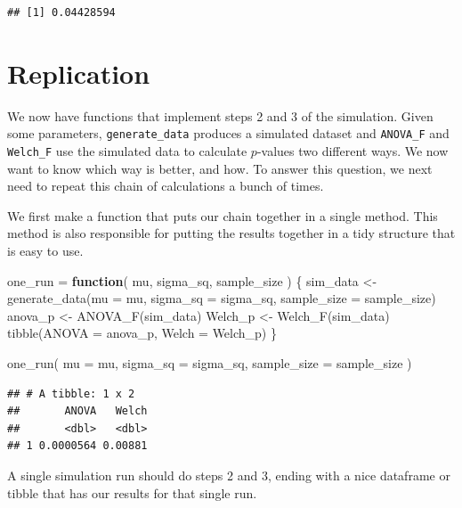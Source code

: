 \documentclass[
]{book}
\newenvironment{Shaded}{\begin{snugshade}}{\end{snugshade}}
\newcommand{\AttributeTok}[1]{\textcolor[rgb]{0.77,0.63,0.00}{#1}}
\newcommand{\ControlFlowTok}[1]{\textcolor[rgb]{0.13,0.29,0.53}{\textbf{#1}}}
\newcommand{\FunctionTok}[1]{\textcolor[rgb]{0.00,0.00,0.00}{#1}}
\newcommand{\NormalTok}[1]{#1}
\newcommand{\OtherTok}[1]{\textcolor[rgb]{0.56,0.35,0.01}{#1}}
\begin{document}
\begin{verbatim}
## [1] 0.04428594
\end{verbatim}

\hypertarget{replication}{%
\section{Replication}\label{replication}}

We now have functions that implement steps 2 and 3 of the simulation.
Given some parameters, \texttt{generate\_data} produces a simulated dataset and \texttt{ANOVA\_F} and \texttt{Welch\_F} use the simulated data to calculate \(p\)-values two different ways.
We now want to know which way is better, and how.
To answer this question, we next need to repeat this chain of calculations a bunch of times.

We first make a function that puts our chain together in a single method.
This method is also responsible for putting the results together in a tidy structure that is easy to use.

\begin{Shaded}
\begin{Highlighting}[]
\NormalTok{one\_run }\OtherTok{=} \ControlFlowTok{function}\NormalTok{( mu, sigma\_sq, sample\_size ) \{}
\NormalTok{  sim\_data }\OtherTok{\textless{}{-}} \FunctionTok{generate\_data}\NormalTok{(}\AttributeTok{mu =}\NormalTok{ mu, }\AttributeTok{sigma\_sq =}\NormalTok{ sigma\_sq, }\AttributeTok{sample\_size =}\NormalTok{ sample\_size)}
\NormalTok{  anova\_p }\OtherTok{\textless{}{-}} \FunctionTok{ANOVA\_F}\NormalTok{(sim\_data)}
\NormalTok{  Welch\_p }\OtherTok{\textless{}{-}} \FunctionTok{Welch\_F}\NormalTok{(sim\_data)}
  \FunctionTok{tibble}\NormalTok{(}\AttributeTok{ANOVA =}\NormalTok{ anova\_p, }\AttributeTok{Welch =}\NormalTok{ Welch\_p)}
\NormalTok{\}}

\FunctionTok{one\_run}\NormalTok{( }\AttributeTok{mu =}\NormalTok{ mu, }\AttributeTok{sigma\_sq =}\NormalTok{ sigma\_sq, }\AttributeTok{sample\_size =}\NormalTok{ sample\_size )}
\end{Highlighting}
\end{Shaded}

\begin{verbatim}
## # A tibble: 1 x 2
##       ANOVA   Welch
##       <dbl>   <dbl>
## 1 0.0000564 0.00881
\end{verbatim}

A single simulation run should do steps 2 and 3, ending with a nice dataframe or tibble that has our results for that single run.
\end{document}
